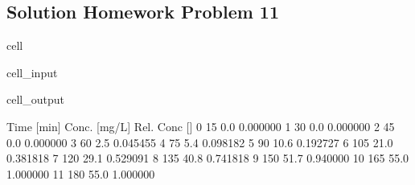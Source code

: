 \documentclass[letterpaper,10pt,english]{jupyterBook}
\begin{document}
\subsection{Solution Homework Problem 11}
\label{\detokenize{content/tutorials/T9/tutorial_09:solution-homework-problem-11}}
\begin{sphinxuseclass}{cell}\begin{sphinxVerbatimInput}

\begin{sphinxuseclass}{cell_input}
\begin{sphinxVerbatim}[commandchars=\\\{\}]

   

   

      
  
\end{sphinxVerbatim}

\end{sphinxuseclass}\end{sphinxVerbatimInput}
\begin{sphinxVerbatimOutput}

\begin{sphinxuseclass}{cell_output}
\begin{sphinxVerbatim}[commandchars=\\\{\}]
    Time [min]  Conc. [mg/L]  Rel. Conc [\PYGZhy{}]
0           15           0.0       0.000000
1           30           0.0       0.000000
2           45           0.0       0.000000
3           60           2.5       0.045455
4           75           5.4       0.098182
5           90          10.6       0.192727
6          105          21.0       0.381818
7          120          29.1       0.529091
8          135          40.8       0.741818
9          150          51.7       0.940000
10         165          55.0       1.000000
11         180          55.0       1.000000
\end{sphinxVerbatim}

\end{sphinxuseclass}\end{sphinxVerbatimOutput}

\end{sphinxuseclass}
\end{document}
